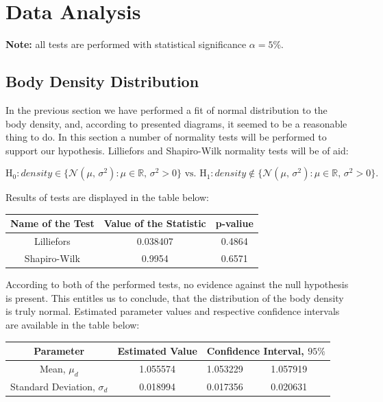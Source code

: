 \documentclass[11pt,american,american]{article}
\begin{document}
\newpage


\section{Data Analysis}\label{sec:analysis}

\textbf{Note:} all tests are performed with statistical significance $\alpha = 5\%$.

\subsection{Body Density Distribution}\label{sec:density_distr}

In the previous section we have performed a fit of normal distribution to the body density, and, according to presented diagrams, it seemed to be a reasonable thing to do. In this section a number of normality tests will be performed to support our hypothesis. Lilliefors and Shapiro-Wilk normality tests will be of aid: 

\begin{equation*}
	\text{H}_{0}: density \in \{ \mathcal{N} (\mu,\,\sigma^{2}): \mu \in \mathbb{R}, \, \sigma^{2} > 0 \} \text{ vs. }
	\text{H}_{1}: density \not\in \{ \mathcal{N} (\mu,\,\sigma^{2}): \mu \in \mathbb{R}, \, \sigma^{2} > 0 \}.
\end{equation*}

\medskip

Results of tests are displayed in the table below:

\begin{table}[ht!]
	\centering
	\begin{tabular}{|c||c|c|}
		\hline 
		Name of the Test & Value of the Statistic & p-valiue \\ 
		\hline \hline
		Lilliefors & 0.038407 & 0.4864 \\ 
		\hline 
		Shapiro-Wilk & 0.9954 & 0.6571 \\ 
		\hline 
	\end{tabular} 
\end{table}

According to both of the performed tests, no evidence against the null hypothesis is present. This entitles us to conclude, that the distribution of the body density is truly normal. Estimated parameter values and respective confidence intervals are available in the table below:

\begin{table}[ht!]
	\centering
	\begin{tabular}{|c||c||p{2cm}|p{2cm}|}
		\hline 
		Parameter &  Estimated Value & \multicolumn{2}{c|}{Confidence Interval, $95\%$}   \\ 
		\hline \hline 
		Mean, $\mu_{d}$ & 1.055574 & 1.053229 &  1.057919  \\ 
		\cline{1-4}
		Standard Deviation, $\sigma_{d}$ & 0.018994 & 0.017356 &  0.020631  \\ 
		\hline
	\end{tabular} 
\end{table}
\end{document}
